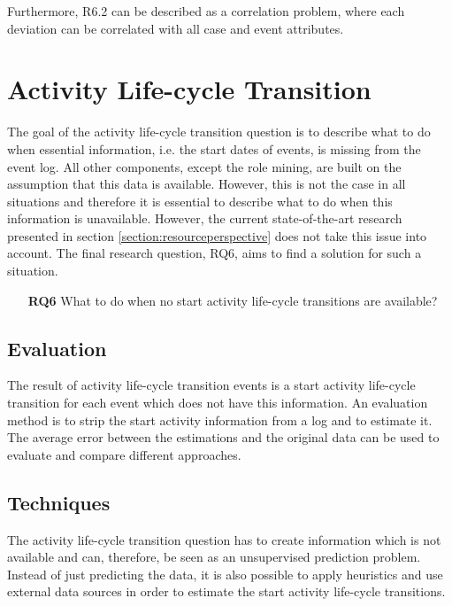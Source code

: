 Furthermore, R6.2 can be described as a correlation problem, where each deviation can be correlated with all case and event attributes. 


\section{Activity Life-cycle Transition}
The goal of the activity life-cycle transition question is to describe what to do when essential information, i.e. the start dates of events, is missing from the event log. All other components, except the role mining, are built on the assumption that this data is available. However, this is not the case in all situations and therefore it is essential to describe what to do when this information is unavailable. However, the current state-of-the-art research presented in section \ref{section:resourceperspective} does not take this issue into account. The final research question, RQ6, aims to find a solution for such a situation. 

\begin{enumerate}
\item[\textbf{RQ6}] What to do when no start activity life-cycle transitions are available?
\end{enumerate}

\subsection{Evaluation}
The result of activity life-cycle transition events is a start activity life-cycle transition for each event which does not have this information. An evaluation method is to strip the start activity information from a log and to estimate it. The average error between the estimations and the original data can be used to evaluate and compare different approaches. 

\subsection{Techniques}
The activity life-cycle transition question has to create information which is not available and can, therefore, be seen as an unsupervised prediction problem. Instead of just predicting the data, it is also possible to apply heuristics and use external data sources in order to estimate the start activity life-cycle transitions. 
